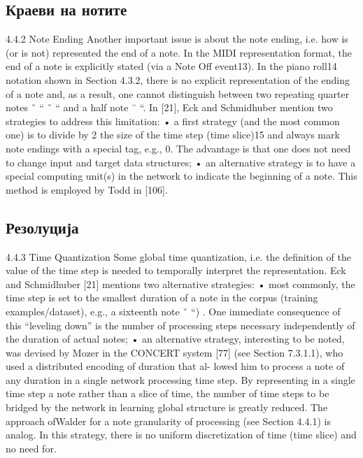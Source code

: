 \subsection{Краеви на нотите}
4.4.2 Note Ending
Another important issue is about the note ending, i.e. how is (or is not) represented the end of a note. In the MIDI representation format, the end of a note is explicitly stated (via a Note Off event13). In the piano roll14 notation shown in Section 4.3.2, there is no explicit representation of the ending of a note and, as a result, one cannot distinguish between two
repeating quarter notes ˇ “ ˇ “ and a half note ˘ “. In [21], Eck and Schmidhuber mention two strategies to address this limitation:
• a first strategy (and the most common one) is to divide by 2 the size of the time step (time slice)15 and always mark note endings with a special tag, e.g., 0. The advantage is
that one does not need to change input and target data structures;
• an alternative strategy is to have a special computing unit(s) in the network to indicate the beginning of a note. This method is employed by Todd in [106].

\subsection{Резолуција}
4.4.3 Time Quantization
Some global time quantization, i.e. the definition of the value of the time step is needed to temporally interpret the representation. Eck and Schmidhuber [21] mentions two alternative strategies:
• most commonly, the time step is set to the smallest duration of a note in the corpus
(training examples/dataset), e.g., a sixteenth note ˇ “) . One immediate consequence of this “leveling down” is the number of processing steps necessary independently of the duration of actual notes;
• an alternative strategy, interesting to be noted, was devised by Mozer in the CONCERT system [77] (see Section 7.3.1.1), who used a distributed encoding of duration that al-
lowed him to process a note of any duration in a single network processing time step. By representing in a single time step a note rather than a slice of time, the number of time steps to be bridged by the network in learning global structure is greatly reduced. The approach ofWalder for a note granularity of processing (see Section 4.4.1) is analog. In this strategy, there is no uniform discretization of time (time slice) and no need for.

